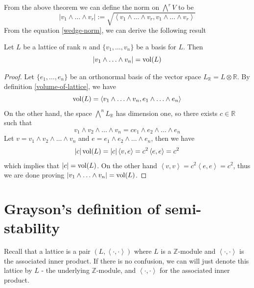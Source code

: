 From the above theorem we can define the norm on $\bigwedge^r V$ to be 
\begin{equation}\label{wedge-norm}
    |v_1\wedge \ldots \wedge v_r| := \sqrt{\left\langle v_1\wedge \ldots \wedge v_r,v_1\wedge \ldots \wedge v_r\right\rangle}
\end{equation}
From the equation \eqref{wedge-norm}, we can derive the following result
\begin{lemma}
    Let $L$ be a lattice of rank $n$ and $\{v_1,\ldots,v_n\}$ be a basis for $L$. Then 
    \[|v_1\wedge \ldots \wedge v_n| = \operatorname{vol}(L)\]
\end{lemma}
\begin{proof}
    Let $\{e_1,\ldots,e_n\}$ be an orthonormal basis of the vector space $L_\mathbb{R} = L \otimes \mathbb{R}$. By definition \ref{volume-of-lattice}, we have 
    \[\operatorname{vol}(L) = \left\langle v_1\wedge \ldots \wedge v_n, e_1\wedge \ldots \wedge e_n\right\rangle\]
    On the other hand, the space $\bigwedge^n L_\mathbb{R}$ has dimension one, so there exists $c \in \mathbb{R}$ such that 
    \[v_1\wedge v_2 \wedge \ldots \wedge v_n = c e_1 \wedge e_2 \wedge \ldots \wedge e_n\]
    Let $v = v_1\wedge v_2 \wedge \ldots \wedge v_n$ and $e = e_1 \wedge e_2 \wedge \ldots \wedge e_n$, then we have 
    \begin{align*}
        |c|\operatorname{vol}(L)  =|c| \left\langle v,e \right\rangle
                    =c^2\left\langle e,e\right\rangle 
                    =c^2
    \end{align*}
    which implies that $|c| = \operatorname{vol}(L)$. On the other hand $\left\langle v,v\right\rangle = c^2 \left\langle e,e\right\rangle =c^2$, thus we are done proving $|v_1\wedge \ldots \wedge v_n| = \operatorname{vol}(L) $. \qedhere
\end{proof}
\section{Grayson's definition of semi-stability}
Recall that a lattice is a pair $(L,\left\langle\cdot,\cdot\right\rangle)$ where $L$ is a $\mathbb{Z}$-module
and $\left\langle\cdot,\cdot\right\rangle$ is the associated inner product. If there is no confusion, we can will just denote this lattice by $L$ - the underlying $\mathbb{Z}$-module, and $\left\langle \cdot,\cdot\right\rangle$ for  the associated inner product.
